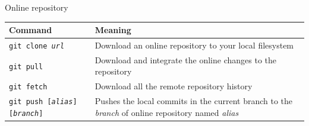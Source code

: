 \documentclass[aspectratio=169]{beamer}
\newcommand{\cd}[1]{\texttt{#1}}
\begin{document}
\begin{frame}{Online repository}
\begin{table}
    \scriptsize
    \centering
    \begin{tabular}{p{}p{}}
        \toprule
        \alert{Command}	&	\alert{Meaning}\\
        \midrule
        \cd{git clone \textit{url}}	&	Download an online repository to your local filesystem\\
        \cd{git pull}	&	Download and integrate the online changes to the repository\\
        \cd{git fetch}	&	Download all the remote repository history\\
        \cd{git push [\textit{alias}] [\textit{branch}]}	& Pushes the local commits in the current branch to the \textit{branch} of online repository named \textit{alias}\\
        \bottomrule
        \end{tabular}
\end{table}
\end{frame}
\end{document}
